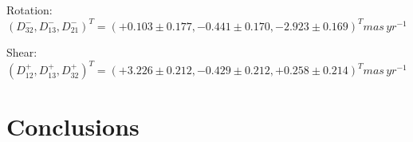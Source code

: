 \documentclass[onecolumn]{aa}   %
\begin{document}
Rotation: $(D^-_{32},  D^-_{13},  D^-_{21} )^T = (+0.103 \pm 0.177, -0.441 \pm 0.170, -2.923 \pm 0.169)^Tmas\,yr^{-1}$

Shear:     $(D^+_{12}, D^+_{13}, D^+_{32})^T = (+3.226 \pm 0.212, -0.429 \pm 0.212,+0.258 \pm 0.214)^Tmas\,yr^{-1}$

\section{Conclusions} \label{sec:conclusions}

\begin{acknowledgements}

\end{acknowledgements}


\end{document}
